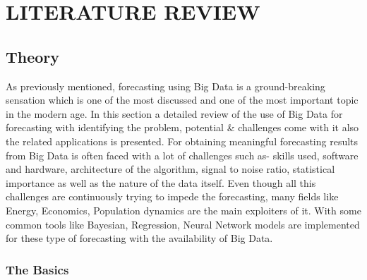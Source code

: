%
%
%

\chapter{\uppercase{Literature Review}}

\section{ Theory}
\label{DST}
As previously mentioned, forecasting using Big Data is a ground-breaking sensation which is  one of the most discussed and one of the most important topic in the modern age. In this section a detailed review of the use of Big Data for forecasting with identifying the problem, potential \& challenges come with it also the related applications is presented. For obtaining meaningful forecasting results from Big Data is often faced with a lot of challenges such as- skills used, software and hardware, architecture of the algorithm, signal to noise ratio, statistical importance as well as the nature of the data itself. Even though all this challenges are continuously trying to impede the forecasting, many fields like Energy, Economics, Population dynamics are the main exploiters of it. With some common tools like Bayesian, Regression, Neural Network models are implemented for these type of forecasting with the availability of Big Data. 


\subsection{The Basics}
\label{Basics}


